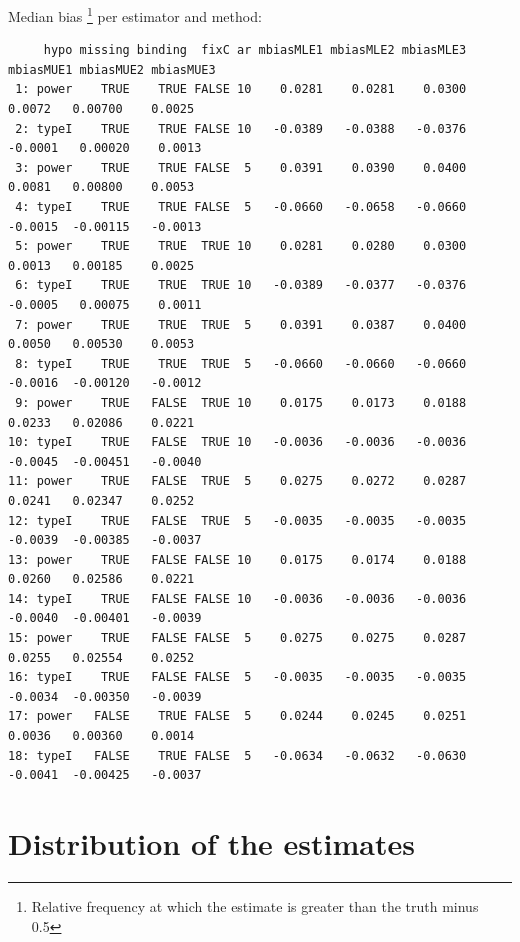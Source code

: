 \documentclass[12pt]{article}
\begin{document}
Median bias \footnote{Relative frequency at which the estimate is greater than the truth minus 0.5} per estimator and method:
\begin{adjustwidth}{-1cm}{-1cm}
\begin{verbatim}
     hypo missing binding  fixC ar mbiasMLE1 mbiasMLE2 mbiasMLE3 mbiasMUE1 mbiasMUE2 mbiasMUE3
 1: power    TRUE    TRUE FALSE 10    0.0281    0.0281    0.0300    0.0072   0.00700    0.0025
 2: typeI    TRUE    TRUE FALSE 10   -0.0389   -0.0388   -0.0376   -0.0001   0.00020    0.0013
 3: power    TRUE    TRUE FALSE  5    0.0391    0.0390    0.0400    0.0081   0.00800    0.0053
 4: typeI    TRUE    TRUE FALSE  5   -0.0660   -0.0658   -0.0660   -0.0015  -0.00115   -0.0013
 5: power    TRUE    TRUE  TRUE 10    0.0281    0.0280    0.0300    0.0013   0.00185    0.0025
 6: typeI    TRUE    TRUE  TRUE 10   -0.0389   -0.0377   -0.0376   -0.0005   0.00075    0.0011
 7: power    TRUE    TRUE  TRUE  5    0.0391    0.0387    0.0400    0.0050   0.00530    0.0053
 8: typeI    TRUE    TRUE  TRUE  5   -0.0660   -0.0660   -0.0660   -0.0016  -0.00120   -0.0012
 9: power    TRUE   FALSE  TRUE 10    0.0175    0.0173    0.0188    0.0233   0.02086    0.0221
10: typeI    TRUE   FALSE  TRUE 10   -0.0036   -0.0036   -0.0036   -0.0045  -0.00451   -0.0040
11: power    TRUE   FALSE  TRUE  5    0.0275    0.0272    0.0287    0.0241   0.02347    0.0252
12: typeI    TRUE   FALSE  TRUE  5   -0.0035   -0.0035   -0.0035   -0.0039  -0.00385   -0.0037
13: power    TRUE   FALSE FALSE 10    0.0175    0.0174    0.0188    0.0260   0.02586    0.0221
14: typeI    TRUE   FALSE FALSE 10   -0.0036   -0.0036   -0.0036   -0.0040  -0.00401   -0.0039
15: power    TRUE   FALSE FALSE  5    0.0275    0.0275    0.0287    0.0255   0.02554    0.0252
16: typeI    TRUE   FALSE FALSE  5   -0.0035   -0.0035   -0.0035   -0.0034  -0.00350   -0.0039
17: power   FALSE    TRUE FALSE  5    0.0244    0.0245    0.0251    0.0036   0.00360    0.0014
18: typeI   FALSE    TRUE FALSE  5   -0.0634   -0.0632   -0.0630   -0.0041  -0.00425   -0.0037
\end{verbatim}

\end{adjustwidth}

\clearpage

\section{Distribution of the estimates}
\label{sec:org58a4e51}
\end{document}
